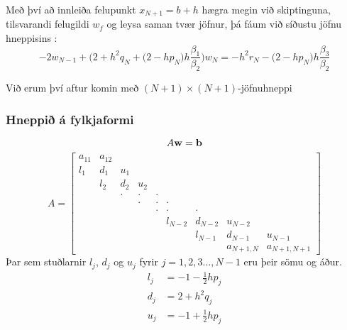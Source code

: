 \documentclass[icelandic,a4paper,12pt]{article}
\begin{document}
\pause
\smallskip
Með því að innleiða felupunkt  $x_{N+1}=b+h$ hægra megin við 
skiptinguna, tilsvarandi
felugildi $w_f$ og leysa saman tvær jöfnur, þá fáum við síðustu jöfnu
hneppisins :
$$
-2w_{N-1}
+\bigg(2+h^2q_N+\big(2-hp_N\big)h\dfrac{\beta_1}{\beta_2}\bigg)w_N
=-h^2r_N-\big(2-hp_N\big)h\dfrac{\beta_3}{\beta_2}
$$

\pause
\smallskip
Við erum því aftur komin með $(N+1)\times (N+1)$-jöfnuhneppi



\subsubsection{Hneppið á fylkjaformi} 
$$
A\mbox{${\bf w}$}=\mbox{${\bf b}$}
$$
$$
A=\left[\begin{matrix}
a_{11}&a_{12}\\
l_1&d_1&u_1\\
&l_2&d_2&u_2\\
&&\cdot&\cdot&\cdot \\
&&&\cdot&\cdot&\cdot \\
&&&&\cdot&\cdot&\cdot \\
&&&&&l_{N-2}&d_{N-2}&u_{N-2} \\
&&&&&&l_{N-1}&d_{N-1}&u_{N-1} \\
&&&&&&&a_{N+1,N}&a_{N+1,N+1}
\end{matrix}\right]
$$
Þar sem stuðlarnir $l_j$, $d_j$ og $u_j$ fyrir 
$j=1,2,3\dots,N-1$ eru þeir sömu og áður.
\begin{align*}
  l_j&=-1-\tfrac 12 hp_j\\
d_j&=2+h^2q_j\\
u_j&=-1+\tfrac 12 hp_j
\end{align*}
\end{document}
